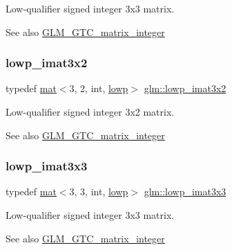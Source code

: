 Low-\/qualifier signed integer 3x3 matrix. \begin{DoxySeeAlso}{See also}
\mbox{\hyperlink{group__gtc__matrix__integer}{G\+L\+M\+\_\+\+G\+T\+C\+\_\+matrix\+\_\+integer}} 
\end{DoxySeeAlso}
\mbox{\label{group__gtc__matrix__integer_ga96983291e90cfeaecde4409ef1ec74dd}} 
\subsubsection{\texorpdfstring{lowp\+\_\+imat3x2}{lowp\_imat3x2}}
{\footnotesize\ttfamily typedef \mbox{\hyperlink{structglm_1_1mat}{mat}}$<$3, 2, int, \mbox{\hyperlink{namespaceglm_a36ed105b07c7746804d7fdc7cc90ff25ae161af3fc695e696ce3bf69f7332bc2d}{lowp}}$>$ \mbox{\hyperlink{group__gtc__matrix__integer_ga96983291e90cfeaecde4409ef1ec74dd}{glm\+::lowp\+\_\+imat3x2}}}

Low-\/qualifier signed integer 3x2 matrix. \begin{DoxySeeAlso}{See also}
\mbox{\hyperlink{group__gtc__matrix__integer}{G\+L\+M\+\_\+\+G\+T\+C\+\_\+matrix\+\_\+integer}} 
\end{DoxySeeAlso}
\mbox{\label{group__gtc__matrix__integer_ga4bfcfb2b121f76d9bff2fb2e4017173a}} 
\subsubsection{\texorpdfstring{lowp\+\_\+imat3x3}{lowp\_imat3x3}}
{\footnotesize\ttfamily typedef \mbox{\hyperlink{structglm_1_1mat}{mat}}$<$3, 3, int, \mbox{\hyperlink{namespaceglm_a36ed105b07c7746804d7fdc7cc90ff25ae161af3fc695e696ce3bf69f7332bc2d}{lowp}}$>$ \mbox{\hyperlink{group__gtc__matrix__integer_ga4bfcfb2b121f76d9bff2fb2e4017173a}{glm\+::lowp\+\_\+imat3x3}}}

Low-\/qualifier signed integer 3x3 matrix. \begin{DoxySeeAlso}{See also}
\mbox{\hyperlink{group__gtc__matrix__integer}{G\+L\+M\+\_\+\+G\+T\+C\+\_\+matrix\+\_\+integer}} 
\end{DoxySeeAlso}
\mbox{\label{group__gtc__matrix__integer_gacbdf7f35076058e4e9be49955ab3fbd3}} 
